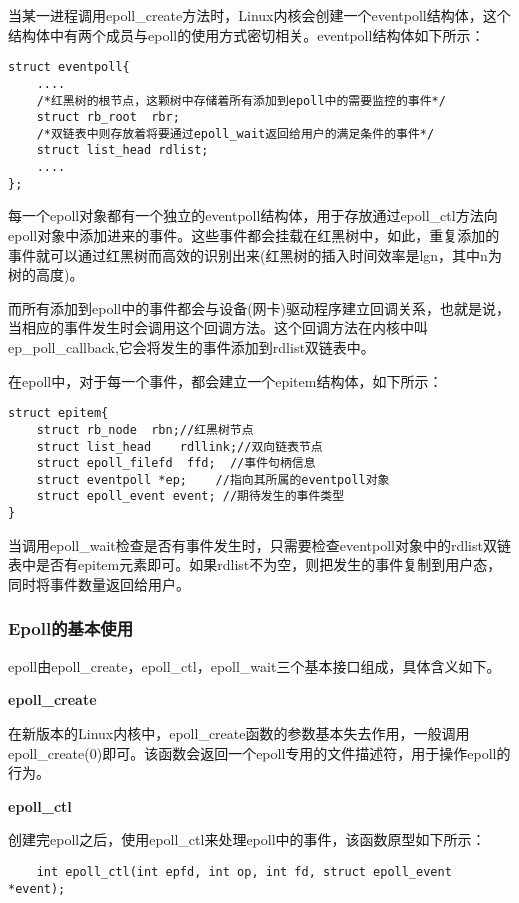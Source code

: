 \documentclass[bachelor]{thesis-uestc}
\begin{document}
当某一进程调用epoll\_create方法时，Linux内核会创建一个eventpoll结构体，这个结构体中有两个成员与epoll的使用方式密切相关。eventpoll结构体如下所示：

\begin{lstlisting}
struct eventpoll{
    ....
    /*红黑树的根节点，这颗树中存储着所有添加到epoll中的需要监控的事件*/
    struct rb_root  rbr;
    /*双链表中则存放着将要通过epoll_wait返回给用户的满足条件的事件*/
    struct list_head rdlist;
    ....
};	
\end{lstlisting}

每一个epoll对象都有一个独立的eventpoll结构体，用于存放通过epoll\_ctl方法向epoll对象中添加进来的事件。这些事件都会挂载在红黑树中，如此，重复添加的事件就可以通过红黑树而高效的识别出来(红黑树的插入时间效率是lgn，其中n为树的高度)。

而所有添加到epoll中的事件都会与设备(网卡)驱动程序建立回调关系，也就是说，当相应的事件发生时会调用这个回调方法。这个回调方法在内核中叫ep\_poll\_callback,它会将发生的事件添加到rdlist双链表中。

在epoll中，对于每一个事件，都会建立一个epitem结构体，如下所示：

\begin{lstlisting}
struct epitem{
    struct rb_node  rbn;//红黑树节点
    struct list_head    rdllink;//双向链表节点
    struct epoll_filefd  ffd;  //事件句柄信息
    struct eventpoll *ep;    //指向其所属的eventpoll对象
    struct epoll_event event; //期待发生的事件类型
}
\end{lstlisting}
当调用epoll\_wait检查是否有事件发生时，只需要检查eventpoll对象中的rdlist双链表中是否有epitem元素即可。如果rdlist不为空，则把发生的事件复制到用户态，同时将事件数量返回给用户。

\subsubsection{Epoll的基本使用}

epoll由epoll\_create，epoll\_ctl，epoll\_wait三个基本接口组成，具体含义如下。

\textbf{epoll\_create}

在新版本的Linux内核中，epoll\_create函数的参数基本失去作用，一般调用epoll\_create(0)即可。该函数会返回一个epoll专用的文件描述符，用于操作epoll的行为。

\textbf{epoll\_ctl}


创建完epoll之后，使用epoll\_ctl来处理epoll中的事件，该函数原型如下所示：
\begin{lstlisting}
	int epoll_ctl(int epfd, int op, int fd, struct epoll_event *event);
\end{lstlisting}
\end{document}
